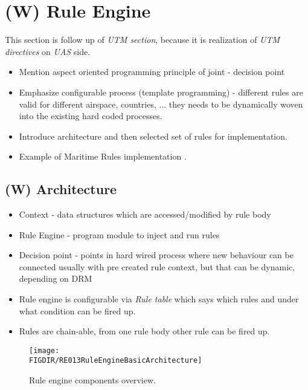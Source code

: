 \section{(W) Rule Engine}\label{sec:ruleEngine}
    \noindent This section is follow up of \emph{UTM section}, because it is realization of \emph{UTM directives} on \emph{UAS} side.
    \begin{itemize}
        \item Mention aspect oriented programming principle of joint - decision point
        \item Emphasize configurable process (template programming) - different rules are valid for different airspace, countries, ... they needs to be dynamically woven into the existing hard coded processes. 
        \item Introduce architecture and then selected set of rules for implementation.
		\item Example of Maritime Rules implementation \cite{benjamin2006navigation}.
    \end{itemize}
    
\subsection{(W) Architecture}\label{s:RuleEngineArchitecture}
    \begin{itemize}
        \item Context - data structures which are accessed/modified by rule body 
        \item Rule Engine - program module to inject and run rules
        \item Decision point - points in hard wired process where new behaviour can be connected usually with pre created rule context, but that can be dynamic, depending on DRM
        \item Rule engine is configurable via \emph{Rule table} which says which rules and under what condition can be fired up.
        \item Rules are chain-able, from one rule body other rule can be fired up.
    \end{itemize}
    \begin{figure}[H]
        \centering
        \texttt{[image: \\FIGDIR/RE013RuleEngineBasicArchitecture]}
        \caption{Rule engine components overview.}
        \label{fig:RuleEngineBasicArchitecture}
    \end{figure}
    
